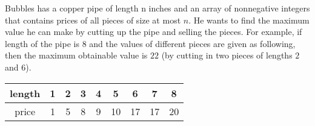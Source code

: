 \documentclass[11pt]{article}
\begin{document}
\newpage
{}
Bubbles has a copper pipe of length n inches and an array of nonnegative integers that contains prices of all pieces of size at most $n$. He wants to find the maximum value he can make by cutting up the pipe and selling the pieces. For example, if length of the pipe is $8$ and the values of different pieces are given as following, then the maximum obtainable value is $22$ (by cutting in two pieces of lengths $2$ and $6$).
\newline

\begin{tabular}{ c | c  c  c  c  c  c  c  c }
length   & 1 &  2 & 3 & 4 & 5 & 6 & 7 & 8  \\ \hline
price    & 1 & 5 & 8 & 9 & 10 & 17 & 17 & 20
\end{tabular}
\newline
\end{document}

